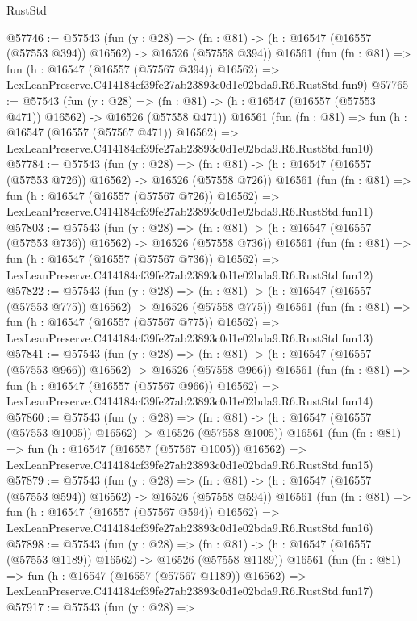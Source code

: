 \begin{lexlean}{RustStd}
\begin{coremodule}
@57746 := @57543
    (fun (y : @28) =>
    (fn : @81) -> (h : @16547 (@16557 (@57553 @394)) @16562) -> @16526 (@57558 @394))
    @16561
    (fun (fn : @81) =>
    fun (h : @16547 (@16557 (@57567 @394)) @16562) =>
    LexLeanPreserve.C414184cf39fe27ab23893c0d1e02bda9.R6.RustStd.fun9)
@57765 := @57543
    (fun (y : @28) =>
    (fn : @81) -> (h : @16547 (@16557 (@57553 @471)) @16562) -> @16526 (@57558 @471))
    @16561
    (fun (fn : @81) =>
    fun (h : @16547 (@16557 (@57567 @471)) @16562) =>
    LexLeanPreserve.C414184cf39fe27ab23893c0d1e02bda9.R6.RustStd.fun10)
@57784 := @57543
    (fun (y : @28) =>
    (fn : @81) -> (h : @16547 (@16557 (@57553 @726)) @16562) -> @16526 (@57558 @726))
    @16561
    (fun (fn : @81) =>
    fun (h : @16547 (@16557 (@57567 @726)) @16562) =>
    LexLeanPreserve.C414184cf39fe27ab23893c0d1e02bda9.R6.RustStd.fun11)
@57803 := @57543
    (fun (y : @28) =>
    (fn : @81) -> (h : @16547 (@16557 (@57553 @736)) @16562) -> @16526 (@57558 @736))
    @16561
    (fun (fn : @81) =>
    fun (h : @16547 (@16557 (@57567 @736)) @16562) =>
    LexLeanPreserve.C414184cf39fe27ab23893c0d1e02bda9.R6.RustStd.fun12)
@57822 := @57543
    (fun (y : @28) =>
    (fn : @81) -> (h : @16547 (@16557 (@57553 @775)) @16562) -> @16526 (@57558 @775))
    @16561
    (fun (fn : @81) =>
    fun (h : @16547 (@16557 (@57567 @775)) @16562) =>
    LexLeanPreserve.C414184cf39fe27ab23893c0d1e02bda9.R6.RustStd.fun13)
@57841 := @57543
    (fun (y : @28) =>
    (fn : @81) -> (h : @16547 (@16557 (@57553 @966)) @16562) -> @16526 (@57558 @966))
    @16561
    (fun (fn : @81) =>
    fun (h : @16547 (@16557 (@57567 @966)) @16562) =>
    LexLeanPreserve.C414184cf39fe27ab23893c0d1e02bda9.R6.RustStd.fun14)
@57860 := @57543
    (fun (y : @28) =>
    (fn : @81) -> (h : @16547 (@16557 (@57553 @1005)) @16562) -> @16526 (@57558 @1005))
    @16561
    (fun (fn : @81) =>
    fun (h : @16547 (@16557 (@57567 @1005)) @16562) =>
    LexLeanPreserve.C414184cf39fe27ab23893c0d1e02bda9.R6.RustStd.fun15)
@57879 := @57543
    (fun (y : @28) =>
    (fn : @81) -> (h : @16547 (@16557 (@57553 @594)) @16562) -> @16526 (@57558 @594))
    @16561
    (fun (fn : @81) =>
    fun (h : @16547 (@16557 (@57567 @594)) @16562) =>
    LexLeanPreserve.C414184cf39fe27ab23893c0d1e02bda9.R6.RustStd.fun16)
@57898 := @57543
    (fun (y : @28) =>
    (fn : @81) -> (h : @16547 (@16557 (@57553 @1189)) @16562) -> @16526 (@57558 @1189))
    @16561
    (fun (fn : @81) =>
    fun (h : @16547 (@16557 (@57567 @1189)) @16562) =>
    LexLeanPreserve.C414184cf39fe27ab23893c0d1e02bda9.R6.RustStd.fun17)
@57917 := @57543
    (fun (y : @28) =>

\end{coremodule}
\end{lexlean}
